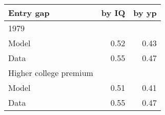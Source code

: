 \begin{tabular}{lrr}
\hline
Entry gap & by IQ  & by yp  \\ 
\hline
1979 &   &   \\ 
Model & 0.52  & 0.43  \\ 
Data & 0.55  & 0.47  \\ 
Higher college premium &   &   \\ 
Model & 0.51  & 0.41  \\ 
Data & 0.55  & 0.47  \\ 
\hline
\end{tabular}%
